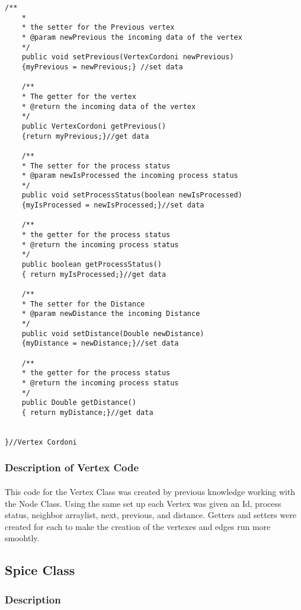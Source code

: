 \documentclass[letterpaper, 10pt,DIV=13]{scrartcl}
\numberwithin{equation}{section} %
\numberwithin{figure}{section} %
\numberwithin{table}{section} %
\begin{document}
\begin{lstlisting}[frame=single, ]
    /**
    * 
    * the setter for the Previous vertex 
    * @param newPrevious the incoming data of the vertex
    */
    public void setPrevious(VertexCordoni newPrevious)
    {myPrevious = newPrevious;} //set data

    /**
    * The getter for the vertex 
    * @return the incoming data of the vertex
    */
    public VertexCordoni getPrevious()
    {return myPrevious;}//get data

    /**
    * The setter for the process status
    * @param newIsProcessed the incoming process status
    */
    public void setProcessStatus(boolean newIsProcessed)
    {myIsProcessed = newIsProcessed;}//set data

    /**
    * the getter for the process status
    * @return the incoming process status
    */
    public boolean getProcessStatus()
    { return myIsProcessed;}//get data

    /**
    * The setter for the Distance
    * @param newDistance the incoming Distance
    */
    public void setDistance(Double newDistance)
    {myDistance = newDistance;}//set data

    /**
    * the getter for the process status
    * @return the incoming process status
    */
    public Double getDistance()
    { return myDistance;}//get data

   
}//Vertex Cordoni

\end{lstlisting}

\subsubsection{Description of Vertex Code}
\paragraph{} This code for the Vertex Class was created by previous knowledge working with the Node Class. Using the same set up each Vertex was given an Id, process status, neighbor arraylist, next, previous, and distance. Getters and setters were created for each to make the creation of the vertexes and edges run more smoohtly. 

\subsection{Spice Class}

\subsubsection{Description}
\end{document}
